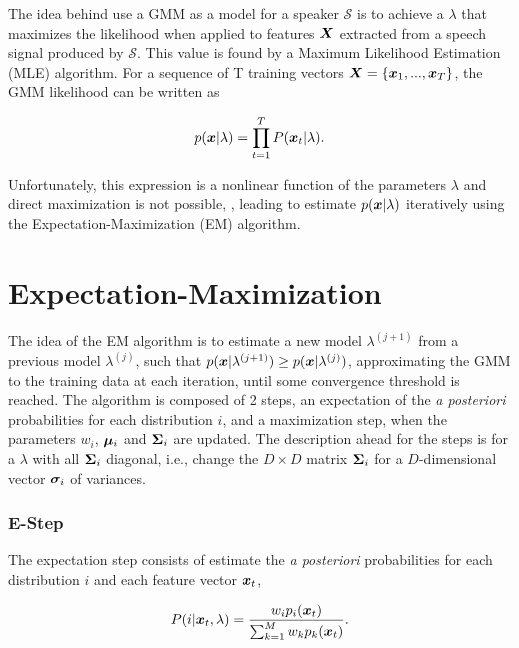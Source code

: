 The idea behind use a GMM as a model for a speaker $\mathcal{S}$ is to achieve a $\lambda$ that maximizes the likelihood when applied to features $\boldsymbol{X}$ extracted from a speech signal produced by $\mathcal{S}$. This value is found by a Maximum Likelihood Estimation (MLE) algorithm. For a sequence of T training vectors $\boldsymbol{X} = \{\boldsymbol{x}_1, ..., \boldsymbol{x}_T\}$, the GMM likelihood can be written as

\begin{equation}
    \postpdf{\dvec{x}}{\lambda} = \prod_{t=1}^T \postprob{\dvec{x}_t}{\lambda}.
    \label{eq:likelihood_gmm_mle}
\end{equation}

\noindent Unfortunately, this expression is a nonlinear function of the parameters $\lambda$ and direct maximization is not possible, , leading to estimate $p(\boldsymbol{x}|\lambda)$ iteratively using the Expectation-Maximization (EM) algorithm.

\section{Expectation-Maximization}

The idea of the EM algorithm is to estimate a new model $\lambda^{(j+1)}$ from a previous model $\lambda^{(j)}$, such that $p(\boldsymbol{x}|\lambda^{(j+1)}) \geq p(\boldsymbol{x}|\lambda^{(j)})$, approximating the GMM to the training data at each iteration, until some convergence threshold is reached. The algorithm is composed of 2 steps, an expectation of the \emph{a posteriori} probabilities for each distribution $i$, and a maximization step, when the parameters $w_i$, $\boldsymbol{\mu}_i$ and $\boldsymbol{\Sigma}_i$ are updated. The description ahead for the steps is for a $\lambda$ with all $\boldsymbol{\Sigma}_i$ diagonal, i.e., change the $D \times D$ matrix $\boldsymbol{\Sigma}_i$ for a $D$-dimensional vector $\boldsymbol{\sigma}_i$ of variances.

\subsubsection*{E-Step}

The expectation step consists of estimate the \emph{a posteriori} probabilities for each distribution $i$ and each feature vector $\boldsymbol{x}_t$,

\begin{equation}
    \postprob{i}{\dvec{x}_t, \lambda} = \frac{w_i p_i(\dvec{x}_t)}{\sum_{k=1}^M w_k p_k(\dvec{x}_t)}.
    \label{eq:e-step-posterior}
\end{equation}

